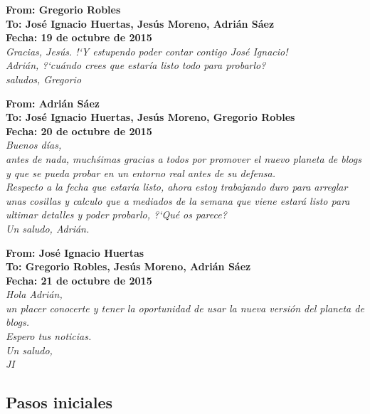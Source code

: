 \documentclass[a4paper, 12pt]{book}
\begin{document}
\begin{shaded}
\noindent\textbf{\textsf{
From: Gregorio Robles\\
To: Jos\'e Ignacio Huertas, Jes\'us Moreno, Adri\'an S\'aez\\
Fecha: 19 de octubre de 2015\\
}}
\emph{
Gracias, Jes\'us. !`Y estupendo poder contar contigo Jos\'e Ignacio!\\
Adri\'an, ?`cu\'ando crees que estar\'ia listo todo para probarlo?\\
saludos, Gregorio
}
\end{shaded}

\begin{shaded}
\noindent\textbf{\textsf{
From: Adri\'an S\'aez\\
To: Jos\'e Ignacio Huertas, Jes\'us Moreno, Gregorio Robles\\
Fecha: 20 de octubre de 2015\\
}}
\emph{
Buenos d\'ias,\\
antes de nada, much\'simas gracias a todos por promover el nuevo planeta de blogs y que se pueda probar en un entorno real antes de su defensa.\\
Respecto a la fecha que estar\'ia listo, ahora estoy trabajando duro para arreglar unas cosillas y calculo que a mediados de la semana que viene estar\'a listo para 
ultimar detalles y poder probarlo, ?`Qu\'e os parece?\\
Un saludo, Adri\'an.
}
\end{shaded}

\begin{shaded}
\noindent\textbf{\textsf{
From: Jos\'e Ignacio Huertas\\
To: Gregorio Robles, Jes\'us Moreno, Adri\'an S\'aez\\
Fecha: 21 de octubre de 2015\\
}}
\emph{
Hola Adri\'an,\\
un placer conocerte y tener la oportunidad de usar la nueva versi\'on del planeta de blogs.\\
Espero tus noticias.\\
Un saludo,\\
JI
}\newline
\end{shaded}

\subsection{Pasos iniciales}
\label{subseccion:correosypasos}
\end{document}
